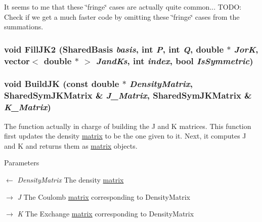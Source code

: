 It seems to me that these \char`\"{}fringe\char`\"{} cases are actually quite common... TODO: Check if we get a much faster code by omitting these \char`\"{}fringe\char`\"{} cases from the summations. \hypertarget{classJKBuilder_1_1PsiShared_ac2d3bee6c0f963913d26d6cc3f7e2403}{
\subsubsection[{FillJK2}]{\setlength{\rightskip}{0pt plus 5cm}void FillJK2 ({\bf SharedBasis} {\em basis}, \/  int {\em P}, \/  int {\em Q}, \/  double $\ast$ {\em JorK}, \/  vector$<$ double $\ast$ $>$ {\em JandKs}, \/  int {\em index}, \/  bool {\em IsSymmetric})}}
\label{classJKBuilder_1_1PsiShared_ac2d3bee6c0f963913d26d6cc3f7e2403}
\hypertarget{classJKBuilder_1_1PsiShared_aa5f73a8109ec88464262262164feda1e}{
\subsubsection[{BuildJK}]{\setlength{\rightskip}{0pt plus 5cm}void BuildJK (const double $\ast$ {\em DensityMatrix}, \/  {\bf SharedSymJKMatrix} \& {\em J\_\-Matrix}, \/  {\bf SharedSymJKMatrix} \& {\em K\_\-Matrix})}}
\label{classJKBuilder_1_1PsiShared_aa5f73a8109ec88464262262164feda1e}


The function actually in charge of building the J and K matrices. This function first updates the density \hyperlink{classJKBuilder_1_1matrix}{matrix} to be the one given to it. Next, it computes J and K and returns them as \hyperlink{classJKBuilder_1_1matrix}{matrix} objects.


\begin{DoxyParams}{Parameters}
\item[\mbox{$\leftarrow$} {\em DensityMatrix}]The density \hyperlink{classJKBuilder_1_1matrix}{matrix} \item[\mbox{$\rightarrow$} {\em J}]The Coulomb \hyperlink{classJKBuilder_1_1matrix}{matrix} corresponding to DensityMatrix \item[\mbox{$\rightarrow$} {\em K}]The Exchange \hyperlink{classJKBuilder_1_1matrix}{matrix} corresponding to DensityMatrix \end{DoxyParams}


